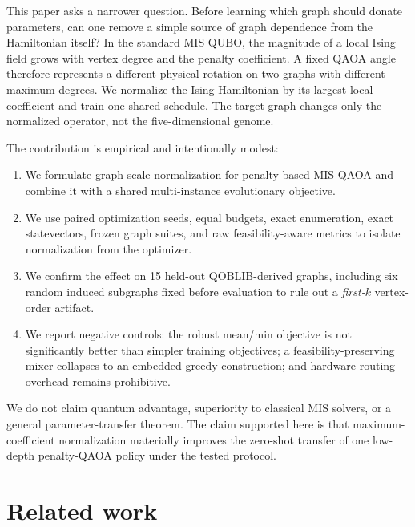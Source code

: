 \documentclass[10pt,twocolumn]{article}
\begin{document}
This paper asks a narrower question. Before learning which graph should donate parameters, can one remove a simple source of graph dependence from the Hamiltonian itself? In the standard MIS QUBO, the magnitude of a local Ising field grows with vertex degree and the penalty coefficient. A fixed QAOA angle therefore represents a different physical rotation on two graphs with different maximum degrees. We normalize the Ising Hamiltonian by its largest local coefficient and train one shared schedule. The target graph changes only the normalized operator, not the five-dimensional genome.

The contribution is empirical and intentionally modest:

\begin{enumerate}[leftmargin=*,nosep]
    \item We formulate graph-scale normalization for penalty-based MIS QAOA and combine it with a shared multi-instance evolutionary objective.
    \item We use paired optimization seeds, equal budgets, exact enumeration, exact statevectors, frozen graph suites, and raw feasibility-aware metrics to isolate normalization from the optimizer.
    \item We confirm the effect on 15 held-out QOBLIB-derived graphs, including six random induced subgraphs fixed before evaluation to rule out a \emph{first-$k$} vertex-order artifact.
    \item We report negative controls: the robust mean/min objective is not significantly better than simpler training objectives; a feasibility-preserving mixer collapses to an embedded greedy construction; and hardware routing overhead remains prohibitive.
\end{enumerate}

We do not claim quantum advantage, superiority to classical MIS solvers, or a general parameter-transfer theorem. The claim supported here is that maximum-coefficient normalization materially improves the zero-shot transfer of one low-depth penalty-QAOA policy under the tested protocol.

\section{Related work}
\end{document}

